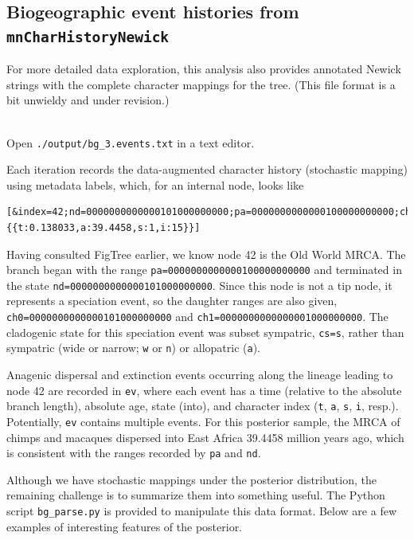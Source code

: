 \subsection{Biogeographic event histories from {\tt mnCharHistoryNewick}}

For more detailed data exploration, this analysis also provides annotated Newick strings with the complete character mappings for the tree.
(This file format is a bit unwieldy and under revision.)

\noindent \\ \impmark Open {\tt ./output/bg\_3.events.txt} in a text editor.

Each iteration records the data-augmented character history (stochastic mapping) using metadata labels, which, for an internal node, looks like

\begin{snugshade}
\begin{lstlisting}
[&index=42;nd=0000000000000101000000000;pa=0000000000000100000000000;ch0=0000000000000101000000000;ch1=0000000000000001000000000;cs=s;bn=41;ev={{t:0.138033,a:39.4458,s:1,i:15}}]
\end{lstlisting}
\end{snugshade}

Having consulted FigTree earlier, we know node 42 is the Old World MRCA.
The branch began with the range {\tt pa=0000000000000100000000000} and terminated in the state {\tt nd=0000000000000101000000000}.
Since this node is not a tip node, it represents a speciation event, so the daughter ranges are also given, {\tt ch0=0000000000000101000000000} and {\tt ch1=0000000000000001000000000}.
The cladogenic state for this speciation event was subset sympatric, {\tt cs=s}, rather than sympatric (wide or narrow; {\tt w} or  {\tt n}) or allopatric ({\tt a}).

Anagenic dispersal and extinction events occurring along the lineage leading to node 42 are recorded in {\tt ev}, where each event has a time (relative to the absolute branch length), absolute age, state (into), and character index ({\tt t}, {\tt a}, {\tt s}, {\tt i}, resp.).
Potentially, {\tt ev} contains multiple events.
For this posterior sample, the MRCA of chimps and macaques dispersed into East Africa 39.4458 million years ago, which is consistent with the ranges recorded by {\tt pa} and {\tt nd}.

Although we have stochastic mappings under the posterior distribution, the remaining challenge is to summarize them into something useful. The Python script {\tt bg\_parse.py} is provided to manipulate this data format. Below are a few examples of interesting features of the posterior.

